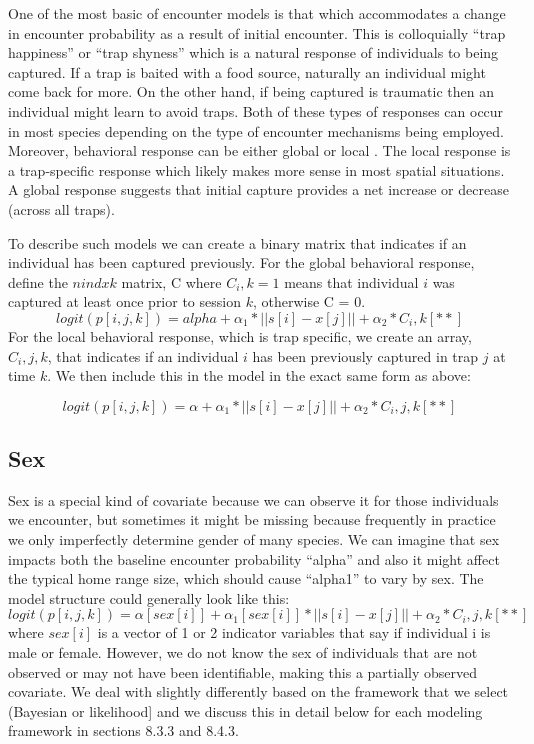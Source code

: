 One of the most basic of encounter models is that which accommodates a
change in encounter probability as a result of initial encounter.
This is colloquially ``trap happiness'' or ``trap shyness'' which is a
natural response of individuals to being captured. If a trap is baited
with a food source, naturally an individual might come back for
more. On the other hand, if being captured is traumatic then an
individual might learn to avoid traps. Both of these types of
responses can occur in most species depending on the type of encounter
mechanisms being employed. Moreover, behavioral response can be either
global \citep{gardner_etal:2010} or local \citep{royle_etal:2009jwm}.
The local response is a trap-specific response which likely makes more
sense in most spatial situations. A global response suggests that
initial capture provides a net increase or decrease (across all
traps).

To describe such models we can create a binary matrix that indicates
if an individual has been captured previously.  For the global
behavioral response, define the $nind x k$ matrix, C where $C_i,k =1$
means that individual $i$ was captured at least once prior to session
$k$, otherwise C = 0.
\[
	logit(p[i,j,k]) = alpha + \alpha_1 *||s[i]-x[j]|| + \alpha_2*C_i,k	[**]
\]
For the local behavioral response, which is trap specific, we create
an array, $C_i,j,k$, that indicates if an individual $i$ has been
previously captured in trap $j$ at time $k$.  We then include this in
the model in the exact same form as above:

       \[
	logit(p[i,j,k]) = \alpha + \alpha_1*||s[i]-x[j]|| + \alpha_2*C_i,j,k	[**]
        \]


\subsection{Sex}

Sex is a special kind of covariate because we can observe it for those individuals we encounter, but sometimes it might be missing because frequently in practice we only imperfectly determine gender of many species. We can imagine that sex impacts both the baseline encounter probability ``alpha'' and also it might affect the typical home range size, which should cause ``alpha1'' to vary by sex.  The model structure could generally look like this:
       \[
	logit(p[i,j,k]) = \alpha[sex[i]] + \alpha_1[sex[i]]*||s[i]-x[j]|| + \alpha_2*C_i,j,k	[**]
        \]
where $sex[i]$ is a vector of 1 or 2 indicator variables that say if individual i is male or female.  However, we do not know the sex of individuals that are not observed or may not have been identifiable, making this a partially observed covariate.  We deal with slightly differently based on the framework that we select (Bayesian or likelihood] and we discuss this in detail below for each modeling framework in sections 8.3.3 and 8.4.3.
 



